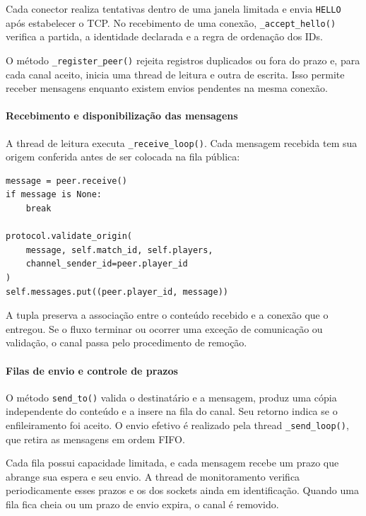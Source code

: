 \documentclass[11pt,a4paper]{article}
\begin{document}
Cada conector realiza tentativas dentro de uma janela limitada e envia \texttt{HELLO} após estabelecer o TCP. No recebimento de uma conexão, \texttt{\_accept\_hello()} verifica a partida, a identidade declarada e a regra de ordenação dos IDs.

O método \texttt{\_register\_peer()} rejeita registros duplicados ou fora do prazo e, para cada canal aceito, inicia uma thread de leitura e outra de escrita. Isso permite receber mensagens enquanto existem envios pendentes na mesma conexão.

\paragraph{Recebimento e disponibilização das mensagens}

A thread de leitura executa \texttt{\_receive\_loop()}. Cada mensagem recebida tem sua origem conferida antes de ser colocada na fila pública:

\par\smallskip
\noindent
\begin{minipage}{\linewidth}
\begin{verbatim}
message = peer.receive()
if message is None:
    break

protocol.validate_origin(
    message, self.match_id, self.players,
    channel_sender_id=peer.player_id
)
self.messages.put((peer.player_id, message))
\end{verbatim}
\end{minipage}
\par\smallskip

A tupla preserva a associação entre o conteúdo recebido e a conexão que o entregou. Se o fluxo terminar ou ocorrer uma exceção de comunicação ou validação, o canal passa pelo procedimento de remoção.

\paragraph{Filas de envio e controle de prazos}

O método \texttt{send\_to()} valida o destinatário e a mensagem, produz uma cópia independente do conteúdo e a insere na fila do canal. Seu retorno indica se o enfileiramento foi aceito. O envio efetivo é realizado pela thread \texttt{\_send\_loop()}, que retira as mensagens em ordem FIFO.

Cada fila possui capacidade limitada, e cada mensagem recebe um prazo que abrange sua espera e seu envio. A thread de monitoramento verifica periodicamente esses prazos e os dos sockets ainda em identificação. Quando uma fila fica cheia ou um prazo de envio expira, o canal é removido.
\end{document}

